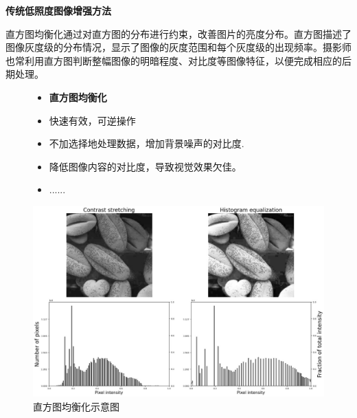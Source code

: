 \documentclass[CJK,aspectratio=169]{beamer}  %
\begin{document}
	\begin{frame}
		{ \yahei \textbf{传统低照度图像增强方法}}
		
		{ \yahei 直方图均衡化通过对直方图的分布进行约束，改善图片的亮度分布。直方图描述了图像灰度级的分布情况，显示了图像的灰度范围和每个灰度级的出现频率。摄影师也常利用直方图判断整幅图像的明暗程度、对比度等图像特征，以便完成相应的后期处理。}
		
		\begin{figure}
			\centering			
			\begin{minipage}{.4\columnwidth}
				\begin{itemize}
					\item {} \yahei \textbf{直方图均衡化}
					
					\item[\checkmark]
					 \yahei 快速有效，可逆操作				
					
					\item[\checkmark]
					 \yahei 不加选择地处理数据，增加背景噪声的对比度.
				
					\item[\checkmark]
					 \yahei 降低图像内容的对比度，导致视觉效果欠佳。
					
					\item[\checkmark]
					 \yahei ......
					
				\end{itemize}
			\end{minipage}
			\begin{minipage}{.55\columnwidth}
				\setlength{\abovecaptionskip}{-0.05cm}
				\centering 
				\includegraphics[width=\columnwidth]{picture/LLIE/HE/Histogram equalization}
				\caption{
					\label{fig: Histogram equalization} 
					\tiny 直方图均衡化示意图
				}
			\end{minipage}
		\end{figure}
		
	\end{frame}
	
\end{document}
